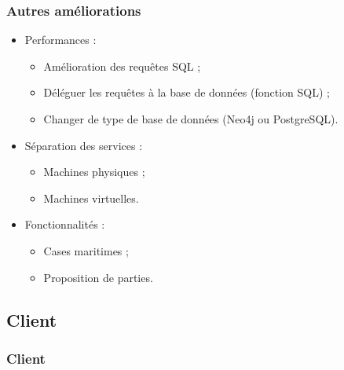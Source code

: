 	\begin{frame}
		\frametitle{Autres améliorations}
		\begin{itemize}
			\item Performances :
				\begin{itemize}
					\item Amélioration des requêtes SQL ;
					\item Déléguer les requêtes à la base de données (fonction SQL) ;
					\item Changer de type de base de données (Neo4j ou PostgreSQL).
				\end{itemize}
			\item Séparation des services :
				\begin{itemize}
					\item Machines physiques ;
					\item Machines virtuelles.
				\end{itemize}
			\item Fonctionnalités :
				\begin{itemize}
					\item Cases maritimes ;
					\item Proposition de parties.
				\end{itemize}
		\end{itemize}
	\end{frame}

\subsection{Client}
	\begin{frame}
		\frametitle{Client}
	\end{frame}
